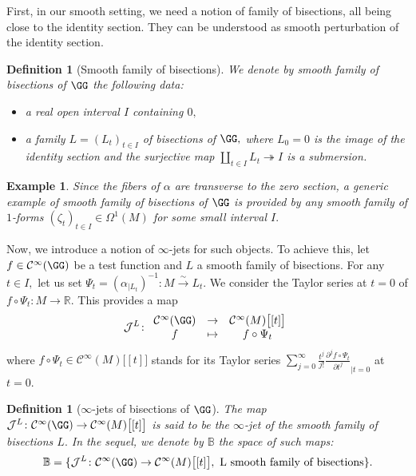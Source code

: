 \documentclass[a4paper,11pt]{article}
\newcommand{\func}[1]{\mathcal{C}^{\infty}(#1)}
\newtheorem{definition}[theorem]{Definition}
\newtheorem{ex}[theorem]{Example}
\begin{document}
First, in our smooth setting, we need a notion of family of bisections, all being close to the identity section. They can be understood as smooth perturbation of the identity section.
\begin{definition}[Smooth family of bisections]
We denote by smooth family of bisections of $\GG$ the following data:
\begin{itemize}
\item a real open interval $I$ containing $0,$
\item a family $L = (L_t)_{t \in I}$ of bisections of $\GG,$ where $L_0 =0$ is the image of the identity section and the surjective map $\coprod\limits_{t \in I} L_t \twoheadrightarrow I$ is a submersion.
\end{itemize}
\end{definition}
\begin{ex}\label{ex:smooth_bis}
Since the fibers of $\alpha$ are transverse to the zero section, a generic example of smooth family of bisections of $\GG$ is provided by any smooth family of $1$-forms $(\zeta_t)_{t \in I} \in \Omega^1(M)$ for some small interval $I.$
\end{ex}

Now, we introduce a notion of $\infty$-jets for such objects. To achieve this, let $f \in \func{\GG}$ be a test function and $L$ a smooth family of bisections. For any $t \in I,$ let us set $\Psi_t = \left(\alpha_{|L_t}\right)^{-1} \colon M \overset{\sim}{\to} L_t.$ We consider the Taylor series at $t=0$ of $f \circ \Psi_t \colon M \to \mathbb{R}.$ This provides a map
\[
\mathcal{J}^L \colon 
\begin{array}{ccc}
\func{\GG} & \to & \func{M}\bigl[[t]\bigr]\\
f & \mapsto & f \circ \Psi_t
\end{array}
\]
where $f \circ \Psi_t \in \func{M}\bigl[[t]\bigr]$ stands for its Taylor series $\sum\limits_{j = 0}^{\infty} \frac{t^j}{j!} \frac{\partial^j f \circ \Psi_t}{\partial t^j}_{| t=0}$ at $t=0.$
\begin{definition}[$\infty$-jets of bisections of $\GG$]\label{def:jets_bis}
The map $\mathcal{J}^L \colon \func{\GG} \to \func{M}\bigl[ [t] \bigr]$ is said to be the $\infty$-jet of the smooth family of bisections $L.$ In the sequel, we denote by $\mathbb{B}$ the space of such maps: 
\[
\mathbb{B} = \{ \mathcal{J}^L \colon \func{\GG} \to \func{M}\bigl[ [t] \bigr], \text{ L smooth family of bisections} \}.
\]
\end{definition}
\end{document}
